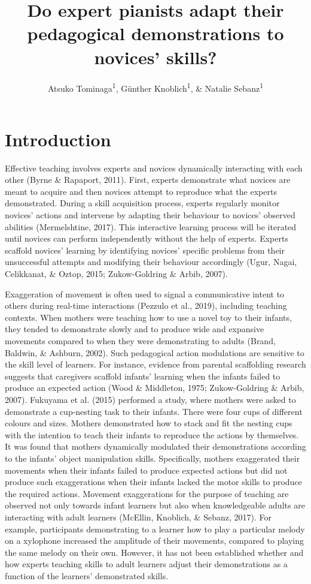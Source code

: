\documentclass[
  man,floatsintext]{apa6}
\title{Do expert pianists adapt their pedagogical demonstrations to novices' skills?}
\author{Atsuko Tominaga\textsuperscript{1}, Günther Knoblich\textsuperscript{1}, \& Natalie Sebanz\textsuperscript{1}}
\date{}
\affiliation{\vspace{0.5cm}\textsuperscript{1} Department of Cognitive Science, Central European University}
\begin{document}
\maketitle

\hypertarget{introduction}{%
\section{Introduction}\label{introduction}}

Effective teaching involves experts and novices dynamically interacting with each other (Byrne \& Rapaport, 2011). First, experts demonstrate what novices are meant to acquire and then novices attempt to reproduce what the experts demonstrated. During a skill acquisition process, experts regularly monitor novices' actions and intervene by adapting their behaviour to novices' observed abilities (Mermelshtine, 2017). This interactive learning process will be iterated until novices can perform independently without the help of experts. Experts scaffold novices' learning by identifying novices' specific problems from their unsuccessful attempts and modifying their behaviour accordingly (Ugur, Nagai, Celikkanat, \& Oztop, 2015; Zukow-Goldring \& Arbib, 2007).

Exaggeration of movement is often used to signal a communicative intent to others during real-time interactions (Pezzulo et al., 2019), including teaching contexts. When mothers were teaching how to use a novel toy to their infants, they tended to demonstrate slowly and to produce wide and expansive movements compared to when they were demonstrating to adults (Brand, Baldwin, \& Ashburn, 2002). Such pedagogical action modulations are sensitive to the skill level of learners. For instance, evidence from parental scaffolding research suggests that caregivers scaffold infants' learning when the infants failed to produce an expected action (Wood \& Middleton, 1975; Zukow-Goldring \& Arbib, 2007). Fukuyama et al. (2015) performed a study, where mothers were asked to demonstrate a cup-nesting task to their infants. There were four cups of different colours and sizes. Mothers demonstrated how to stack and fit the nesting cups with the intention to teach their infants to reproduce the actions by themselves. It was found that mothers dynamically modulated their demonstrations according to the infants' object manipulation skills. Specifically, mothers exaggerated their movements when their infants failed to produce expected actions but did not produce such exaggerations when their infants lacked the motor skills to produce the required actions. Movement exaggerations for the purpose of teaching are observed not only towards infant learners but also when knowledgeable adults are interacting with adult learners (McEllin, Knoblich, \& Sebanz, 2017). For example, participants demonstrating to a learner how to play a particular melody on a xylophone increased the amplitude of their movements, compared to playing the same melody on their own. However, it has not been established whether and how experts teaching skills to adult learners adjust their demonstrations as a function of the learners' demonstrated skills.
\end{document}
